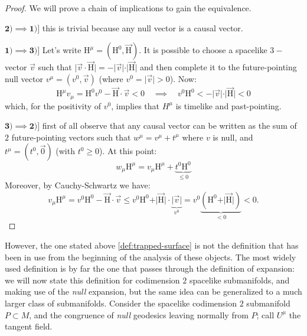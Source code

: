\begin{proof}
	We will prove a chain of implications to gain the equivalence.
	
	\(\mathbf{2) \implies 1)]}\) this is trivial because any null vector is a causal vector.
	
	\(\mathbf{1) \implies 3)]}\) Let's write \(\mathrm{H}^{\mu} = (\mathrm{H}^0, \vec{\mathrm{H}})\). It is possible to choose a spacelike \(3-\)vector \(\vec{v}\) such that \(\vert\vec{v}\cdot\vec{\mathrm{H}}\vert = - \vert\vec{v}\vert\cdot\vert\vec{\mathrm{H}}\vert\) and  then complete it to the future-pointing null vector \(v^{\mu} = (v^0, \vec{v})\) (where \(v^0 = \vert \vec{v}\vert > 0\)).
	Now:
	\[
	\mathrm{H}^{\mu}v_{\mu} = \mathrm{H}^0v^0 - \vec{\mathrm{H}}\cdot\vec{v} < 0 \quad \implies 
	\quad v^0 \mathrm{H}^0 < - \vert\vec{v}\vert\cdot\vert\vec{\mathrm{H}}\vert < 0
	\]
	which, for the positivity of \(v^0\), implies that \(H^{\mu}\) is timelike and past-pointing.
	
	\(\mathbf{3) \implies 2)]}\) first of all observe that any causal vector can be written as the sum of \(2\) future-pointing vectors such that \(w^{\mu}= v^{\mu} + t^{\mu}\) where \(v\) is null, and \(t^{\mu} = (t^0, \vec{0})\) (with \(t^0 \ge 0\)). At this point:
	\[
	w_{\mu}\mathrm{H}^{\mu} = v_{\mu}\mathrm{H}^{\mu} + \underbrace{t^0 \mathrm{H}^0}_{\le0}
	\]
	Moreover, by Cauchy-Schwartz we have:
	\[
	v_{\mu}\mathrm{H}^{\mu} = v^0 \mathrm{H}^0 - \vec{\mathrm{H}}\cdot\vec{v} \le v^0\mathrm{H}^0 +\vert \vec{\mathrm{H}}\vert\cdot\underbrace{\vert\vec{v}\vert}_{v^0} = v^0\underbrace{(\mathrm{H}^0 + \vert \vec{\mathrm{H}}\vert)}_{<0} < 0.
	\]
\end{proof}

However, the one stated above \ref{def:trapped-surface} is not the definition that has been in use from the beginning of the analysis of these objects. The most widely used definition is by far the one that passes through the definition of expansion: we will now state this definition for codimension \(2\) spacelike submanifolds, and making use of the \emph{null} expansion, but the same idea can be generalized to a much larger class of submanifolds. Consider the spacelike codimension \(2\) submanifold \(P\subset M\), and the congruence of \emph{null} geodesics leaving normally from \(P\); call \(U^{\mu}\) the tangent field.

